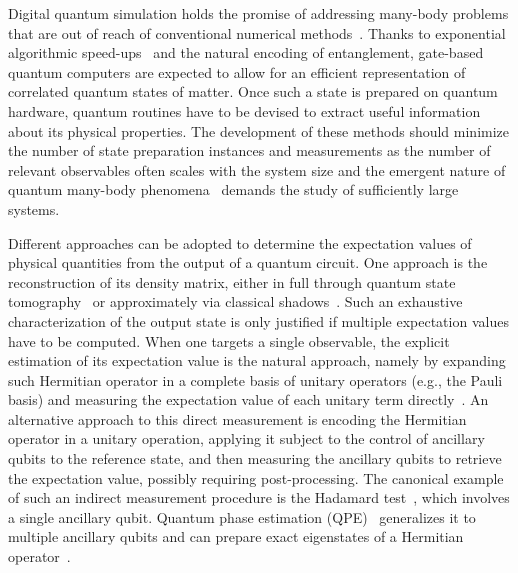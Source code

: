 \documentclass[aps,prl,twocolumn]{revtex4}
\begin{document}
\maketitle

Digital quantum simulation holds the promise of addressing many-body problems that are out of reach of conventional numerical methods~\cite{Cao19, McArdle20}. Thanks to exponential algorithmic speed-ups~\cite{Lloyd96, Childs18} %
and the natural encoding of entanglement, %
gate-based quantum computers are expected to allow for an efficient representation of correlated quantum states of matter. Once such a state is prepared on quantum hardware, quantum routines have to be devised to extract useful information about its physical properties. The development of these methods should minimize the number of state preparation instances and measurements as the number of relevant observables often scales with the system size and the emergent nature of quantum many-body phenomena~\cite{Anderson72} demands the study of sufficiently large systems. 

Different approaches can be adopted to determine the expectation values of physical quantities from the output of a quantum circuit. One approach is the reconstruction of its density matrix, either in full through quantum state tomography~\cite{NielsenChuang10} or approximately %
via classical shadows~\cite{Huang20}. Such an exhaustive characterization of the output state is only justified if multiple expectation values have to be computed. When one targets a single observable, the explicit estimation of its expectation value is the natural approach, namely by expanding such Hermitian operator in a complete basis of unitary operators (e.g., the Pauli basis) and measuring the expectation value of each unitary term directly~\cite{Peruzzo14}. An alternative approach to this direct measurement is encoding the Hermitian operator in a unitary operation, applying it subject to the control of ancillary qubits to the reference state, and then measuring the ancillary qubits to retrieve the expectation value, possibly requiring post-processing. The canonical example of such an indirect measurement procedure is the Hadamard test~\cite{Cleve98}, which involves a single ancillary qubit. Quantum phase estimation (QPE)~\cite{Kitaev95, NielsenChuang10} generalizes it to multiple ancillary qubits %
and can prepare exact eigenstates of a Hermitian operator~\cite{NielsenChuang10}.%
\end{document}
